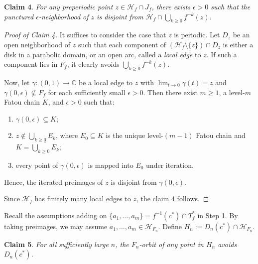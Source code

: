 \documentclass[a4paper,reqno,times, 11pt]{amsart}
\theoremstyle{remark}
\theoremstyle{plain}
\numberwithin{equation}{section}
\def\HHH{{\cal H}}
\def\g{\gamma}
\def\C{\mbox{$\mathbb C$}}
\def\cal{\mathcal}
\begin{document}
		 {\bf Claim 4}. \emph{For any preperiodic point $z\in \HHH_f\cap J_f$, there exists $\epsilon>0$ such that the  punctured $\epsilon$-neighborhood of $z$ is disjoint from $\HHH_f\cap \bigcup_{k\geq0}f^{-k}(z)$.}
		\begin{proof}[Proof of Claim 4]
			It suffices to consider the case that $z$ is periodic. Let $D_z$ be an open neighborhood of $z$ such that each component of $(\HHH_f\setminus\{z\})\cap D_z$ is either a disk in a parabolic domain, or an open arc, called a \emph{local edge} to $z$. If such a component  lies in $F_f$,  it clearly avoids $\bigcup_{k\geq0}f^{-k}(z)$.
			
		Now, let $\g:(0,1)\to\C$ be a local edge to $z$ with $\lim_{t\to0}\g(t)=z$ and $\g(0,\epsilon)\not\subseteq F_f$ for each sufficiently small $\epsilon>0$.
		Then
			 there exist $m \geq 1$, a level-$m$  Fatou chain $K$, and $\epsilon > 0$ such that:
			\begin{enumerate}
				\item $\g(0,\epsilon) \subseteq K$;
				\item $z \notin \bigcup_{k \geq 0} E_k$, where $E_0\subseteq K$ is the unique level-$(m-1)$  Fatou chain and $K=\overline{\bigcup_{k\geq0} E_k}$;
				\item every point of $\g(0,\epsilon)$ is mapped into $E_0$ under iteration.
			\end{enumerate}
			Hence, the iterated preimages of $z$ is disjoint from  $\g(0,\epsilon)$. 
			
			Since $\mathcal{H}_f$ has finitely many local edges to $z$, the claim 4 follows.
		\end{proof}
		Recall the assumptions adding on $\{a_1,\ldots,a_m\} = f^{-1}(c^*) \cap T_f^*$ in Step 1. By taking preimages, we may assume $a_1,\ldots,a_m\in  \mathcal{H}_{F_n}$. Define $H_n := D_n(c^*) \cap \mathcal{H}_{F_n}$.\vspace{5pt}
		
		 {\bf Claim 5}. \emph{For all sufficiently large $n$, the $F_n$-orbit of any point in $H_n$ avoids $D_n(c^*)$.}
		
\end{document}

